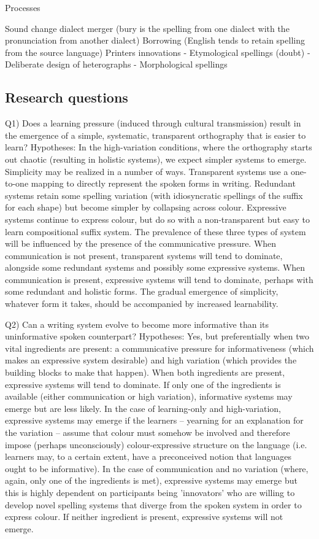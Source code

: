 \documentclass[doc,biblatex]{apa7}
\begin{document}
Processes

Sound change
dialect merger (bury is the spelling from one dialect with the pronunciation from another dialect)
Borrowing (English tends to retain spelling from the source language)
Printers innovations
- Etymological spellings (doubt)
- Deliberate design of heterographs
- Morphological spellings

\subsection{Research questions}

Q1) Does a learning pressure (induced through cultural transmission) result in the emergence of a simple, systematic, transparent orthography that is easier to learn? Hypotheses: In the high-variation conditions, where the orthography starts out chaotic (resulting in holistic systems), we expect simpler systems to emerge. Simplicity may be realized in a number of ways. Transparent systems use a one-to-one mapping to directly represent the spoken forms in writing. Redundant systems retain some spelling variation (with idiosyncratic spellings of the suffix for each shape) but become simpler by collapsing across colour. Expressive systems continue to express colour, but do so with a non-transparent but easy to learn compositional suffix system. The prevalence of these three types of system will be influenced by the presence of the communicative pressure. When communication is not present, transparent systems will tend to dominate, alongside some redundant systems and possibly some expressive systems. When communication is present, expressive systems will tend to dominate, perhaps with some redundant and holistic forms. The gradual emergence of simplicity, whatever form it takes, should be accompanied by increased learnability.

Q2) Can a writing system evolve to become more informative than its uninformative spoken counterpart? Hypotheses: Yes, but preferentially when two vital ingredients are present: a communicative pressure for informativeness (which makes an expressive system desirable) and high variation (which provides the building blocks to make that happen). When both ingredients are present, expressive systems will tend to dominate. If only one of the ingredients is available (either communication or high variation), informative systems may emerge but are less likely. In the case of learning-only and high-variation, expressive systems may emerge if the learners – yearning for an explanation for the variation – assume that colour must somehow be involved and therefore impose (perhaps unconsciously) colour-expressive structure on the language (i.e. learners may, to a certain extent, have a preconceived notion that languages ought to be informative). In the case of communication and no variation (where, again, only one of the ingredients is met), expressive systems may emerge but this is highly dependent on participants being 'innovators' who are willing to develop novel spelling systems that diverge from the spoken system in order to express colour. If neither ingredient is present, expressive systems will not emerge.
\end{document}
